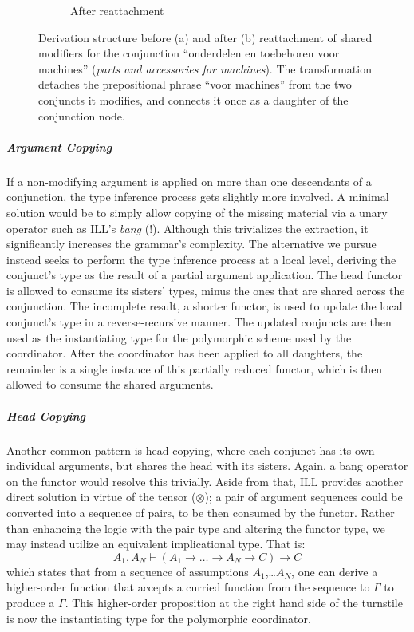 \begin{figure}[t]
\begin{subfigure}[t]{0.49\textwidth}
        \caption{After reattachment}
    \end{subfigure}
    \caption[Conjunction Modifier Reattachment]{Derivation structure before (a) and after (b) reattachment of shared modifiers for the conjunction ``onderdelen en toebehoren voor machines'' (\textit{parts and accessories for machines}). The transformation detaches the prepositional phrase ``voor machines'' from the two conjuncts it modifies, and connects it once as a daughter of the conjunction node.}
\end{figure}

\subparagraph{Argument Copying} 
If a non-modifying argument is applied on more than one descendants of a conjunction, the type inference process gets slightly more involved.
A minimal solution would be to simply allow copying of the missing material via a unary operator such as ILL's \textit{bang} (!).
Although this trivializes the extraction, it significantly increases the grammar's complexity.
The alternative we pursue instead seeks to perform the type inference process at a local level, deriving the conjunct's type as the result of a partial argument application.
The head functor is allowed to consume its sisters' types, minus the ones that are shared across the conjunction.
The incomplete result, a shorter functor, is used to update the local conjunct's type in a reverse-recursive manner.
The updated conjuncts are then used as the instantiating type for the polymorphic scheme used by the coordinator.
After the coordinator has been applied to all daughters, the remainder is a single instance of this partially reduced functor, which is then allowed to consume the shared arguments.

\subparagraph{Head Copying}
Another common pattern is head copying, where each conjunct has its own individual arguments, but shares the head with its sisters.
Again, a bang operator on the functor would resolve this trivially.
Aside from that, ILL provides another direct solution in virtue of the tensor ($\otimes$); a pair of argument sequences could be converted into a sequence of pairs, to be then consumed by the functor.
Rather than enhancing the logic with the pair type and altering the functor type, we may instead utilize an equivalent implicational type.
That is:
\[
A_1, A_N \vdash (A_1 \rightarrow \dots \rightarrow A_N \rightarrow C) \rightarrow C
\]
which states that from a sequence of assumptions $A_1$,\dots $A_N$, one can derive a higher-order function that accepts a curried function from the sequence to $\Gamma$ to produce a $\Gamma$.
This higher-order proposition at the right hand side of the turnstile is now the instantiating type for the polymorphic coordinator.


